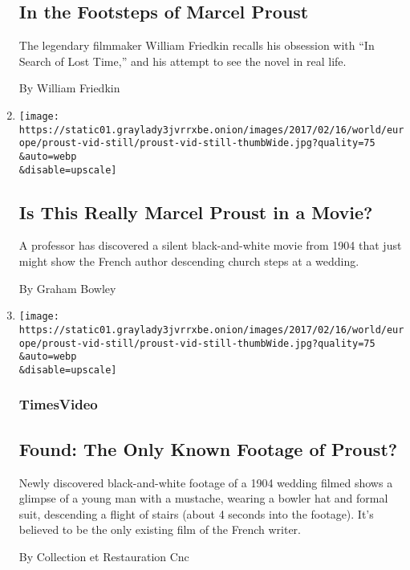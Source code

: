 \begin{enumerate}
  \hypertarget{in-the-footsteps-of-marcel-proust}{%
  \subsection{In the Footsteps of Marcel
  Proust}\label{in-the-footsteps-of-marcel-proust}}

  The legendary filmmaker William Friedkin recalls his obsession with
  ``In Search of Lost Time,'' and his attempt to see the novel in real
  life.

  By William Friedkin
\item
  \href{/2017/02/16/books/marcel-proust-film-movie.html}{}

  \texttt{[image: https://static01.graylady3jvrrxbe.onion/images/2017/02/16/world/europe/proust-vid-still/proust-vid-still-thumbWide.jpg?quality=75\\\&auto=webp\\\&disable=upscale]}

  \hypertarget{is-this-really-marcel-proust-in-a-movie}{%
  \subsection{Is This Really Marcel Proust in a
  Movie?}\label{is-this-really-marcel-proust-in-a-movie}}

  A professor has discovered a silent black-and-white movie from 1904
  that just might show the French author descending church steps at a
  wedding.

  By Graham Bowley
\item
  \href{/video/world/europe/100000004937650/found-the-only-known-footage-of-proust.html}{}

  \texttt{[image: https://static01.graylady3jvrrxbe.onion/images/2017/02/16/world/europe/proust-vid-still/proust-vid-still-thumbWide.jpg?quality=75\\\&auto=webp\\\&disable=upscale]}

  \hypertarget{timesvideo}{%
  \subsubsection{TimesVideo}\label{timesvideo}}

  \hypertarget{found-the-only-known-footage-of-proust}{%
  \subsection{Found: The Only Known Footage of
  Proust?}\label{found-the-only-known-footage-of-proust}}

  Newly discovered black-and-white footage of a 1904 wedding filmed
  shows a glimpse of a young man with a mustache, wearing a bowler hat
  and formal suit, descending a flight of stairs (about 4 seconds into
  the footage). It's believed to be the only existing film of the French
  writer.

  By Collection et Restauration Cnc
\end{enumerate}

